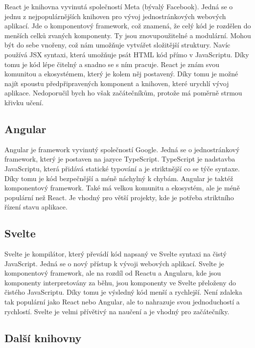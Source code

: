 React je knihovna vyvinutá společností Meta (bývalý Facebook). Jedná se o jednu z nejpopulárnějších knihoven pro vývoj jednostránkových webových aplikací. Jde o komponentový framework, což znamená, že celý kód je rozdělen do menších celků zvaných komponenty. Ty jsou znovupoužitelné a modulární. Mohou být do sebe vnořeny, což nám umožňuje vytvářet složitější struktury. Navíc používá JSX syntaxi, která umožňuje psát HTML kód přímo v JavaScriptu. Díky tomu je kód lépe čitelný a snadno se s ním pracuje. React je znám svou komunitou a ekosystémem, který je kolem něj postavený. Díky tomu je možné najít spoustu předpřipravených komponent a knihoven, které urychlí vývoj aplikace. Nedoporučil bych ho však začátečníkům, protože má poměrně strmou křivku učení.

\subsection*{Angular}
\label{subsec:angular}

Angular je framework vyvinutý společností Google. Jedná se o jednostránkový framework, který je postaven na jazyce TypeScript. TypeScript je nadstavba JavaScriptu, která přidává statické typování a je striktnější co se týče syntaxe. Díky tomu je kód bezpečnější a méně náchylný k chybám. Angular je taktéž komponentový framework. Také má velkou komunitu a ekosystém, ale je méně populární než React. Je vhodný pro větší projekty, kde je potřeba striktního řízení stavu aplikace.

\subsection*{Svelte}
\label{subsec:svelte}

Svelte je kompilátor, který převádí kód napsaný ve Svelte syntaxi na čistý JavaScript. Jedná se o nový přístup k vývoji webových aplikací. Svelte je komponentový framework, ale na rozdíl od Reactu a Angularu, kde jsou komponenty interpretovány za běhu, jsou komponenty ve Svelte přeloženy do čistého JavaScriptu. Díky tomu je výsledný kód menší a rychlejší. Není zdaleka tak populární jako React nebo Angular, ale to nahrazuje svou jednoduchostí a rychlostí. Svelte je velmi přívětivý na naučení a je vhodný pro začátečníky.

\subsection{Další knihovny}
\label{sec:other-libraries}

